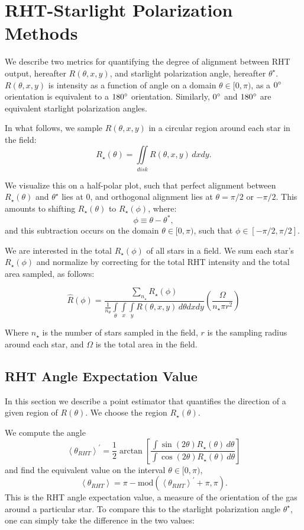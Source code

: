 \documentclass[12pt]{emulateapj}
\newcommand{\beq}{\begin{equation}}
\newcommand{\eeq}{\end{equation}}
\begin{document}
\section{RHT-Starlight Polarization Methods}\label{starpolmethods}
We describe two metrics for quantifying the degree of alignment between RHT output, hereafter ${R(\theta, x, y)}$, and starlight polarization angle, hereafter ${\theta^\star}$. $R(\theta, x, y)$ is intensity as a function of angle on a domain ${\theta \in [0, \pi)}$, as a ${0 \degree}$ orientation is equivalent to a ${180 \degree}$ orientation. Similarly, ${0 \degree}$ and ${180 \degree}$ are equivalent starlight polarization angles.

In what follows, we sample ${R(\theta, x, y)}$ in a circular region around each star in the field:
\beq
R_\star(\theta)  = \iint \limits_{disk}  R(\theta, x, y)  \,dxdy.
\eeq
 
We visualize this on a half-polar plot, such that perfect alignment between ${R_\star(\theta)}$ and ${\theta^\star}$ lies at 0, and orthogonal alignment lies at ${\theta = \pi/2}$ or ${-\pi/2}$. This amounts to shifting $R_\star\left(\theta\right)$ to $R_\star\left(\phi\right)$, where:
\beq
\phi \equiv \theta - \theta^*,
\eeq
 and this subtraction occurs on the domain $\theta \in [0, \pi)$, such that $\phi \in [-\pi/2, \pi/2]$.

We are interested in the total $R_\star\left(\phi\right)$ of all stars in a field. We sum each star's $R_\star\left(\phi\right)$ and normalize by correcting for the total RHT intensity and the total area sampled, as follows:

\beq
\hat{R}\left(\phi\right) = \frac{\sum\limits_{n_{\star}} R_\star(\phi)}{\frac{1}{n_{\theta}} \int\limits_{\theta} \int\limits_x \int\limits_y R\left(\theta, x, y\right) \, d\theta dx dy}\left(\frac{\Omega}{n_{\star}\pi r^2}\right)
\eeq

Where $n_{\star}$ is the number of stars sampled in the field, $r$ is the sampling radius around each star, and $\Omega$ is the total area in the field.

\subsection{RHT Angle Expectation Value}\label{expectval}
In this section we describe a point estimator that quantifies the direction of a given region of ${R(\theta)}$. We choose the region $R_\star\left(\theta\right)$. 

We compute the angle
\beq
\label{carrotrht}
\left<\theta_{RHT} \right>^{\prime}= \frac{1}{2} \arctan \left[ \frac{\int \sin(2{\theta}) R_\star(\theta) \, d\theta}{\int \cos(2{\theta}) R_\star(\theta)\,d\theta} \right]
\eeq
and find the equivalent value on the interval ${\theta \in [0, \pi)}$,
\beq
\left< \theta_{RHT} \right> = \pi - \mathrm{mod}(\left<\theta_{RHT} \right>^{\prime} + \pi, \pi).
\eeq
This is the RHT angle expectation value, a measure of the orientation of the gas around a particular star. To compare this to the starlight polarization angle $\theta^\star$, one can simply take the difference in the two values:
\end{document}
